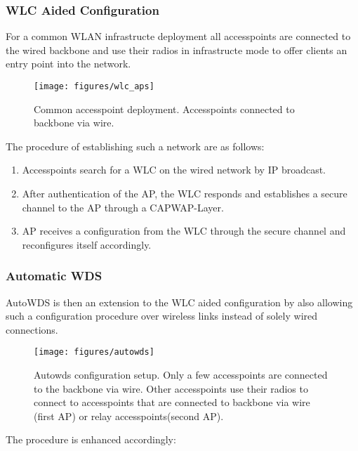       \subsubsection{WLC Aided Configuration}
	For a common WLAN infrastructe deployment all accesspoints are connected to the wired backbone and use their radios in infrastructe mode to 
	offer clients an entry point into the network.
	\begin{figure}[h!]
	  \centering
	  \texttt{[image: figures/wlc\_aps]}
	  \caption{Common accesspoint deployment. Accesspoints connected to backbone via wire.}
	  \label{fig:wlc_aps}
	\end{figure}
	The procedure of establishing such a network are as follows:
	\begin{enumerate}
	 \item Accesspoints search for a \ac{WLC} on the wired network by IP broadcast.
	 \item After authentication of the \ac{AP}, the \ac{WLC} responds and establishes a secure channel to the \ac{AP} through a \ac{CAPWAP}-Layer.
	 \item \ac{AP} receives a configuration from the \ac{WLC} through the secure channel and reconfigures itself accordingly.
	\end{enumerate}
	
      \subsubsection{Automatic \ac{WDS}}
	AutoWDS is then an extension to the WLC aided configuration by also allowing such a configuration procedure over wireless links instead of solely wired connections.
            
	\begin{figure}[h!]
	  \centering
	  \texttt{[image: figures/autowds]}
	  \caption{Autowds configuration setup. Only a few accesspoints are connected to the backbone via wire. 
	    Other accesspoints use their radios to connect to accesspoints that are connected to backbone via wire (first \ac{AP}) or relay accesspoints(second \ac{AP}).}
	  \label{fig:autowds}
	\end{figure}
	
	The procedure is enhanced accordingly:
	
